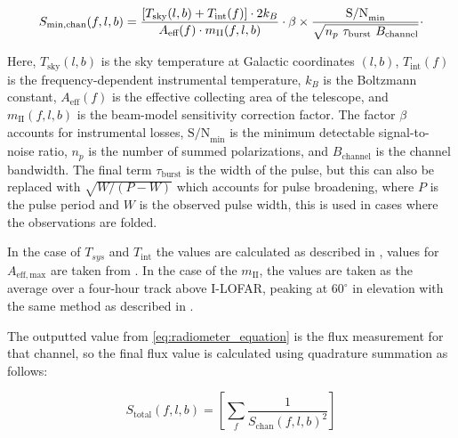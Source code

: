 \begin{equation}
S_{\min,\rm{chan}}(f, l, b) = \frac{\left[ T_{\text{sky}}(l,b) + T_{\text{int}}(f) \right] \cdot 2 k_B}{A_{\text{eff}}(f) \cdot m_{\text{II}} (f, l,b)} \cdot \beta  \times \frac{\text{S/N}_{\min} }{\sqrt{n_p~ \tau_{\mathrm{burst}}~ B_{\text{channel}}}} \cdot 
\end{equation}

Here, $T_{\text{sky}}(l,b)$ is the sky temperature at Galactic coordinates $(l,b)$, $T_{\text{int}}(f)$ is the frequency-dependent instrumental temperature, $k_B$ is the Boltzmann constant, $A_{\text{eff}}(f)$ is the effective collecting area of the telescope, and $m_{\text{II}}(f,l,b)$ is the beam-model sensitivity correction factor. The factor $\beta$ accounts for instrumental losses, $\text{S/N}_{\min}$ is the minimum detectable signal-to-noise ratio, $n_p$ is the number of summed polarizations, and $B_{\text{channel}}$ is the channel bandwidth. The final term $\tau_{\mathrm{burst}}$ is the width of the pulse, but this can also be replaced with $\sqrt{W/(P-W)}$ which accounts for pulse broadening, where $P$ is the pulse period and $W$ is the observed pulse width, this is used in cases where the observations are folded. 

In the case of $T_{sys}$ and $T_{\mathrm{int}}$ the values are calculated as described in \cite{mckenna_census_2024}, values for $A_{\mathrm{eff, max}}$ are taken from \cite{van_haarlem_lofar_2013}. In the case of the $m_{\mathrm{II}}$, the values are taken as the average over a four-hour track above I-LOFAR, peaking at $60^{\circ}$ in elevation with the same method as described in \cite{Vincetti2026}. 

The outputted value from \cref{eq:radiometer_equation} is the flux measurement for that channel, so the final flux value is calculated using quadrature summation as follows: 

\begin{equation}
    S_{\mathrm{total}} (f,l,b) = \left[ \sum_f \frac{1}{S_{\mathrm{chan}}(f,l,b)^2} \right]
\end{equation}




